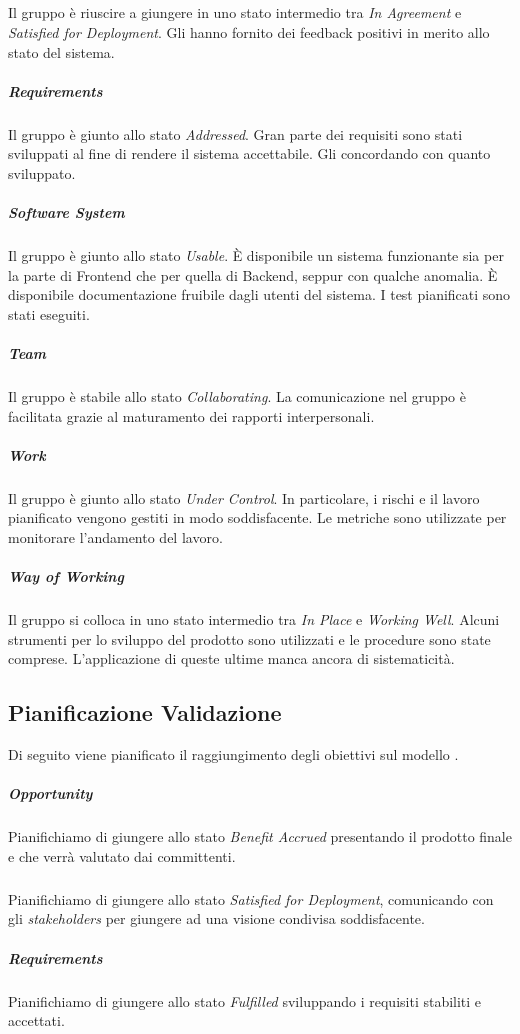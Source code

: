 	\subparagraph{}
	Il gruppo è riuscire a giungere in uno stato intermedio tra \emph{In Agreement} e \emph{Satisfied for Deployment}. Gli  hanno fornito dei feedback positivi in merito allo stato del sistema. %

	\subparagraph{Requirements}
	Il gruppo è giunto allo stato \emph{Addressed}. Gran parte dei requisiti sono stati sviluppati al fine di rendere il sistema accettabile. Gli  concordando con quanto sviluppato.

	\subparagraph{Software System}
	Il gruppo è giunto allo stato \emph{Usable}. \`E disponibile un sistema funzionante sia per la parte di Frontend che per quella di Backend, seppur con qualche anomalia. \`E disponibile documentazione fruibile dagli utenti del sistema. I test pianificati sono stati eseguiti.
 
	\subparagraph{Team}
	Il gruppo è stabile allo stato \emph{Collaborating}. La comunicazione nel gruppo è facilitata grazie al maturamento dei rapporti interpersonali. 

	\subparagraph{Work}
	Il gruppo è giunto allo stato \emph{Under Control}. In particolare, i rischi e il lavoro pianificato vengono gestiti in modo soddisfacente. Le metriche sono utilizzate per monitorare l'andamento del lavoro.

	\subparagraph{Way of Working}
	Il gruppo si colloca in uno stato intermedio tra \emph{In Place} e \emph{Working Well}. Alcuni strumenti per lo sviluppo del prodotto sono utilizzati e le procedure sono state comprese. L'applicazione di queste ultime manca ancora di sistematicità.

\subsection{Pianificazione Validazione}
Di seguito viene pianificato il raggiungimento degli obiettivi sul modello . 

	\subparagraph{Opportunity}
	Pianifichiamo di giungere allo stato \emph{Benefit Accrued} presentando il prodotto finale e che verrà valutato dai committenti.

	\subparagraph{}
	Pianifichiamo di giungere allo stato \emph{Satisfied for Deployment}, comunicando con gli \emph{stakeholders} per giungere ad una visione condivisa soddisfacente.
	
	\subparagraph{Requirements}
	Pianifichiamo di giungere allo stato \emph{Fulfilled} sviluppando i requisiti stabiliti e accettati.
	
